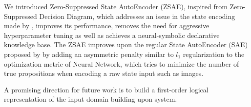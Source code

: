 We introduced Zero-Suppressed State AutoEncoder (ZSAE), inspired from
Zero-Suppressed Decision Diagram, which addresses an issue in the state
encoding made by \latentplanner, improves its performance, removes the need
for aggressive hyperparameter tuning as well as achieves a
neural-symbolic declarative knowledge base.  The ZSAE improves upon the
regular State AutoEncoder (SAE) proposed by \citeauthor{Asai2018} by
adding an asymmetric penalty similar to $l_1$ regularization to the optimization metric of
Neural Network, which tries to minimize the number of true propositions
when encoding a raw state input such as images.

A promising direction for future work is to build a first-order logical
representation of the input domain building upon \latentplanner system.

